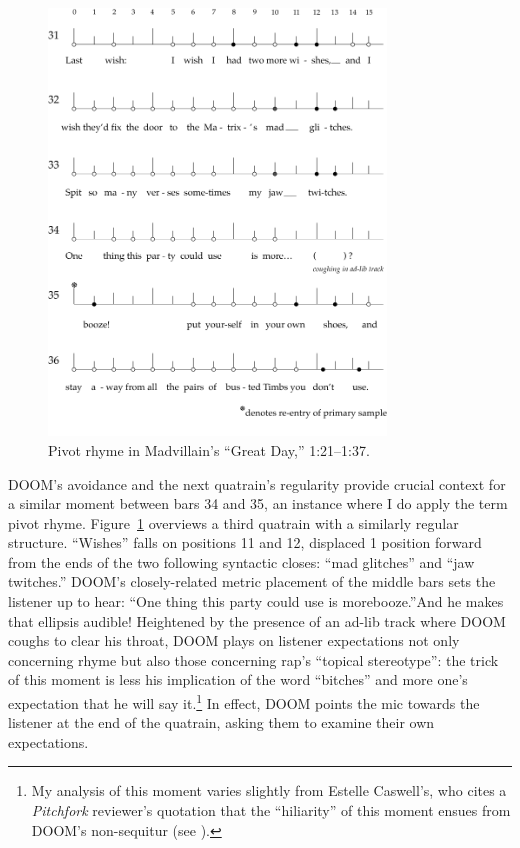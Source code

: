     \begin{figure}[!t]
        \centering
        \includegraphics[width=0.8\textwidth]{images/figures/chp 03/121137greatdayachievedpivot.pdf}
        \caption{Pivot rhyme in Madvillain's ``Great Day,'' 1:21--1:37.}
        \label{fig:doomachievedpiv}
    \end{figure}

DOOM's avoidance and the next quatrain's regularity provide crucial context for a similar moment between 
bars 34 and 35, an instance where I do apply the term pivot rhyme. Figure~\ref{fig:doomachievedpiv} overviews
a third quatrain with a similarly regular structure. ``Wishes''  falls on positions 11 and 12, displaced 1 
position forward from the ends of the two following  syntactic  closes: ``mad glitches'' and
``jaw twitches.'' DOOM's closely-related metric placement of the middle bars sets the listener up to hear:
``One thing this party could use is more\textellipsis booze.''And he makes that ellipsis audible! Heightened
by the presence of an ad-lib track where DOOM coughs to clear his throat, DOOM plays on listener expectations
not only concerning rhyme but also those concerning rap's ``topical stereotype'': the trick of this moment is
less his implication of the word ``bitches'' and more one's expectation that
he will say it.\footnote{
    My analysis of this moment varies slightly from Estelle Caswell's, who cites a \textit{Pitchfork} 
    reviewer's quotation that the ``hiliarity'' of this moment ensues from DOOM's non-sequitur (see
    \cite{estellecaswellRappingDeconstructedBest2016}).}
In effect, DOOM points the mic towards the listener at the end of the quatrain, asking them to examine
their own expectations.

